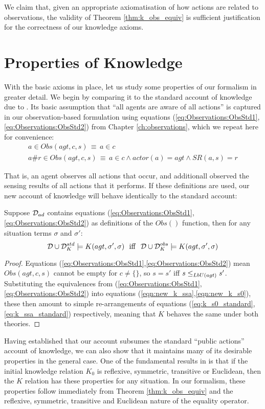 We claim that, given an appropriate axiomatisation of how actions
are related to observations, the validity of Theorem \ref{thm:k_obs_equiv}
is sufficient justification for the correctness of our knowledge axioms.


\section{Properties of Knowledge\label{sec:Knowledge:Properties}}

With the basic axioms in place, let us study some properties of our
formalism in greater detail. We begin by comparing it to the standard
account of knowledge due to \citet{scherl03sc_knowledge}. Its basic
assumption that {}``all agents are aware of all actions'' is captured
in our observation-based formulation using equations (\ref{eq:Observations:ObsStd1},\ref{eq:Observations:ObsStd2})
from Chapter \ref{ch:observations}, which we repeat here for convenience:\begin{gather*}
a\in Obs(agt,c,s)\,\equiv\, a\in c\\
a\#r\in Obs(agt,c,s)\,\equiv\, a\in c\wedge actor(a)=agt\wedge SR(a,s)=r\end{gather*}


That is, an agent observes all actions that occur, and additionall
observed the sensing results of all actions that it performs. If these
definitions are used, our new account of knowledge will behave identically
to the standard account:

\begin{thm}
Suppose $\mathcal{D}_{ad}$ contains equations (\ref{eq:Observations:ObsStd1},\ref{eq:Observations:ObsStd2})
as definitions of the $Obs()$ function, then for any situation terms
$\sigma$ and $\sigma'$:\[
\mathcal{D}\cup\mathcal{D}_{K}^{std}\models K(agt,\sigma',\sigma)\,\,\,\,\mathrm{iff}\,\,\,\,\mathcal{D}\cup\mathcal{D}_{K}^{obs}\models K(agt,\sigma',\sigma)\]

\end{thm}
\begin{proof}
Equations (\ref{eq:Observations:ObsStd1},\ref{eq:Observations:ObsStd2})
mean $Obs(agt,c,s)$ cannot be empty for $c\neq\{\}$, so $s=s'$
iff $s\leq_{LbU(agt)}s'$. Substituting the equivalences from (\ref{eq:Observations:ObsStd1},\ref{eq:Observations:ObsStd2})
into equations (\ref{eqn:new_k_ssa},\ref{eqn:new_k_s0}), these then
amount to simple re-arrangements of equations (\ref{eq:k_s0_standard},\ref{eq:k_ssa_standard})
respectively, meaning that $K$ behaves the same under both theories. 
\end{proof}
Having established that our account subsumes the standard {}``public
actions'' account of knowledge, we can also show that it maintains
many of its desirable properties in the general case. One of the fundamental
results in \citep{scherl03sc_knowledge} is that if the initial knowledge
relation $K_{0}$ is reflexive, symmetric, transitive or Euclidean,
then the $K$ relation has these properties for any situation. In
our formalism, these properties follow immediately from Theorem \ref{thm:k_obs_equiv}
and the reflexive, symmetric, transitive and Euclidean nature of the
equality operator.


